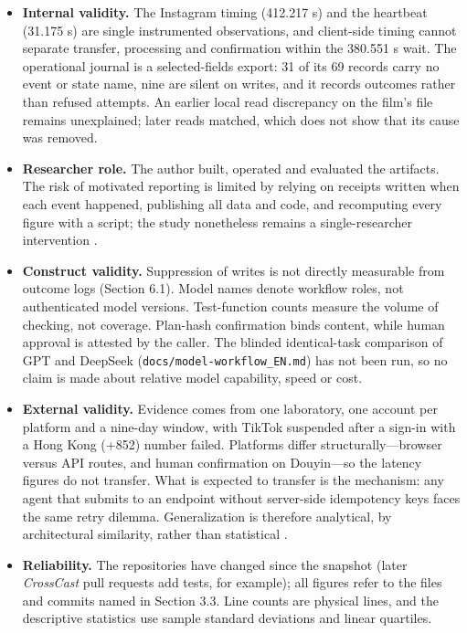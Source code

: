 \documentclass[11pt,a4paper]{article}
\theoremstyle{definition}
\begin{document}
\begin{itemize}[leftmargin=1.8em]
    \item \textbf{Internal validity.} The Instagram timing (412.217 s) and the heartbeat (31.175 s) are single instrumented observations, and client-side timing cannot separate transfer, processing and confirmation within the 380.551 s wait. The operational journal is a selected-fields export: 31 of its 69 records carry no event or state name, nine are silent on writes, and it records outcomes rather than refused attempts. An earlier local read discrepancy on the film's file remains unexplained; later reads matched, which does not show that its cause was removed.
    \item \textbf{Researcher role.} The author built, operated and evaluated the artifacts. The risk of motivated reporting is limited by relying on receipts written when each event happened, publishing all data and code, and recomputing every figure with a script; the study nonetheless remains a single-researcher intervention \citep{Sein2011, Wieringa2014}.
    \item \textbf{Construct validity.} Suppression of writes is not directly measurable from outcome logs (Section 6.1). Model names denote workflow roles, not authenticated model versions. Test-function counts measure the volume of checking, not coverage. Plan-hash confirmation binds content, while human approval is attested by the caller. The blinded identical-task comparison of GPT and DeepSeek (\texttt{docs/\allowbreak{}model-\allowbreak{}workflow\_\allowbreak{}EN.\allowbreak{}md}) has not been run, so no claim is made about relative model capability, speed or cost.
    \item \textbf{External validity.} Evidence comes from one laboratory, one account per platform and a nine-day window, with TikTok suspended after a sign-in with a Hong Kong (+852) number failed. Platforms differ structurally---browser versus API routes, and human confirmation on Douyin---so the latency figures do not transfer. What is expected to transfer is the mechanism: any agent that submits to an endpoint without server-side idempotency keys faces the same retry dilemma. Generalization is therefore analytical, by architectural similarity, rather than statistical \citep{Flyvbjerg2006, Wieringa2015}.
    \item \textbf{Reliability.} The repositories have changed since the snapshot (later \emph{CrossCast} pull requests add tests, for example); all figures refer to the files and commits named in Section 3.3. Line counts are physical lines, and the descriptive statistics use sample standard deviations and linear quartiles.
\end{itemize}
\end{document}
